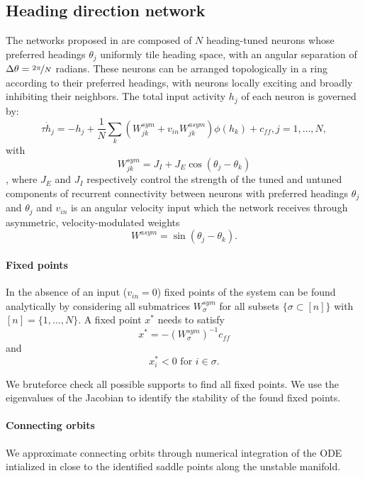 \documentclass{article} %
\newcounter{ct}
\theoremstyle{definition}
\theoremstyle{remark}
\begin{document}
\subsection{Heading direction network}\label{sec:supp:headdirection}
The networks proposed in \citep{Noorman2022} are composed of $N$ heading-tuned neurons whose preferred headings $\theta_j$ uniformly tile heading space, with an angular separation of $\Delta\theta=\nicefrac{2\pi}{N}$ radians.
These neurons can be arranged topologically in a ring according to their preferred headings, with neurons locally exciting and broadly inhibiting their neighbors.
The total input activity $h_j$ of each neuron is governed by:
\begin{equation}
\tau \dot h_j = -h_j + \frac{1}{N} \sum_k (W^{sym}_{jk} + v_{in} W^{asym}_{jk})\phi(h_k)+c_{ff},     j=1,\dots,N,
\end{equation}
with 
\begin{equation}
W^{sym}_{jk} = J_I + J_E \cos(\theta_j - \theta_k)
\end{equation}, where \(J_E\) and \(J_I\) respectively control the strength of the tuned and untuned components of recurrent connectivity between neurons with preferred headings \(\theta_j\) and \(\theta_j\)
and \(v_{in}\) is an angular velocity input which the network receives through asymmetric, velocity-modulated weights \begin{equation}W^{asym} =\sin(\theta_j - \theta_k).\end{equation}


\paragraph{Fixed points}
In the absence of an input (\(v_{in}=0\)) fixed points of the system can be found analytically by considering all submatrices \(W^{sym}_\sigma\) for all subsets \(\{\sigma\subset [n]\}\) with\([n]=\{1,\dots, N\}\).
A fixed point \(x^*\) needs to satisfy
\begin{equation}
x^*= -(W^{sym}_\sigma)^{-1}c_{ff}
\end{equation}
and
\begin{equation}
x^*_i<0 \text{   for  	 } i\in\sigma.
\end{equation}

We bruteforce check all possible supports to find all fixed points.
We use the eigenvalues of the Jacobian to identify the stability of the found fixed points.

\paragraph{Connecting orbits}
We approximate connecting orbits through numerical integration of the ODE intialized in close to the identified saddle points along the unstable manifold.
\end{document}
